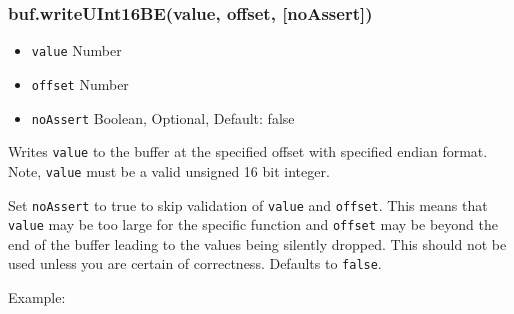 \subsubsection{buf.writeUInt16BE(value, offset,
{[}noAssert{]})}\label{buf.writeuint16bevalue-offset-noassert}

\begin{itemize}
\itemsep1pt\parskip0pt
\item
  \texttt{value} Number
\item
  \texttt{offset} Number
\item
  \texttt{noAssert} Boolean, Optional, Default: false
\end{itemize}

Writes \texttt{value} to the buffer at the specified offset with
specified endian format. Note, \texttt{value} must be a valid unsigned
16 bit integer.

Set \texttt{noAssert} to true to skip validation of \texttt{value} and
\texttt{offset}. This means that \texttt{value} may be too large for the
specific function and \texttt{offset} may be beyond the end of the
buffer leading to the values being silently dropped. This should not be
used unless you are certain of correctness. Defaults to \texttt{false}.

Example:

\begin{Shaded}
\begin{Highlighting}[]
  \NormalTok{(}\NormalTok{);}
\NormalTok{(}\NormalTok{, }\NormalTok{);}
\NormalTok{(}\NormalTok{, }\NormalTok{);}


\NormalTok{(}\NormalTok{, }\NormalTok{);}
\NormalTok{(}\NormalTok{, }\NormalTok{);}


\end{Highlighting}
\end{Shaded}

